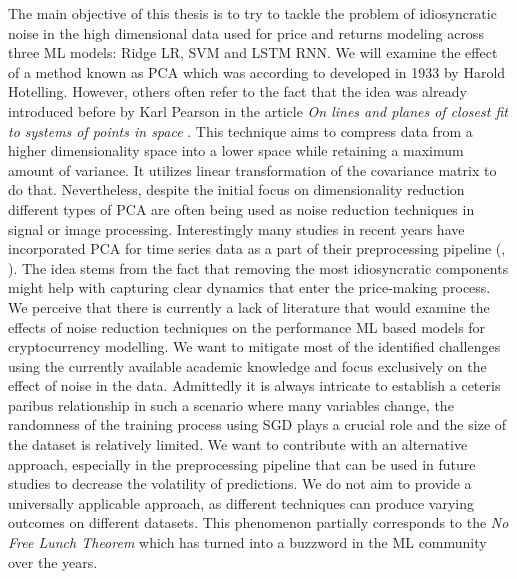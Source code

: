 The main objective of this thesis is to try to tackle the problem of idiosyncratic noise in
the high dimensional data used for price and returns modeling across three ML models: Ridge \ac{LR}, \ac{SVM}
and \ac{LSTM} \ac{RNN}.
We will examine the effect of a method known as \acl{PCA} which was according to 
\cite{Farebrother2022} developed in 1933 by Harold Hotelling. However, others often refer
to the fact 
that the idea was already introduced before by Karl Pearson in the article 
\textit{On lines and planes of closest fit to systems of points in space} \citep{Pearson1901}.
This technique aims to compress data from a higher dimensionality space into a lower space while 
retaining a maximum amount of variance. It utilizes linear transformation of the covariance matrix
to do that.
Nevertheless, despite the initial focus on dimensionality reduction different types of 
\ac{PCA} are often being used as noise reduction techniques in signal or image processing.
Interestingly many studies in recent years have incorporated \ac{PCA} for time series data 
as a part of their preprocessing pipeline (\citet{Chowdhury2018}, \citet{Kristjanpoller2018}).
The idea stems from the fact that removing the most idiosyncratic components
might help with capturing clear dynamics that enter the price-making process.
We perceive that there is currently a lack of literature that would examine the effects of 
noise reduction techniques on the performance \ac{ML} based models
for cryptocurrency modelling. We want to mitigate most of the identified challenges using 
the currently available academic knowledge and focus exclusively on the effect of noise in the data. 
Admittedly it is always intricate to establish a ceteris paribus relationship in such a scenario
where many variables change, the randomness of the training process using \ac{SGD} plays a crucial role 
and the size of the dataset is relatively limited. We want to contribute with an alternative approach, especially 
in the preprocessing pipeline that can be used in future studies to decrease the volatility of predictions.
We do not aim to provide a universally applicable approach, as different techniques 
can produce varying outcomes on different datasets.
This phenomenon partially corresponds to the \textit{No Free Lunch Theorem} \citep{Wolpert1995} which
has turned into a buzzword in the \ac{ML} community over the years.


